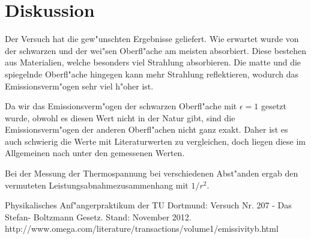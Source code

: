 \newpage
\section{Diskussion}

	Der Versuch hat die gew"unschten Ergebnisse geliefert.
	Wie erwartet wurde von der schwarzen und der wei"sen Oberfl"ache am meisten absorbiert.
	Diese bestehen aus Ma\-te\-ri\-a\-li\-en, welche besonders viel Strahlung absorbieren.
	Die matte und die spiegelnde Oberfl"ache hingegen kann mehr Strahlung reflektieren, wodurch das Emissionsverm"ogen sehr viel h"oher ist.

	Da wir das Emissionsverm"ogen der schwarzen Oberfl"ache mit $\epsilon = 1$ gesetzt wurde, obwohl es diesen Wert nicht in der Natur gibt,
	sind die Emissionsverm"ogen der anderen Oberfl"achen nicht ganz exakt. Daher ist es auch schwierig die Werte mit Literaturwerten zu vergleichen, doch liegen diese im Allgemeinen nach \cite{emission} unter den gemessenen Werten.

	Bei der Messung der Thermospannung bei verschiedenen Abst"anden ergab den ver\-mu\-te\-ten Leistungsabnahmezusammenhang mit $1/r^2$.

\begin{thebibliography}{9}
	 Physikalisches Anf"angerpraktikum der TU Dortmund: Versuch Nr. 207 - Das Stefan- Boltzmann Gesetz. Stand: November 2012.
	 http://www.omega.com/literature/transactions/volume1/emissivityb.html
\end{thebibliography}